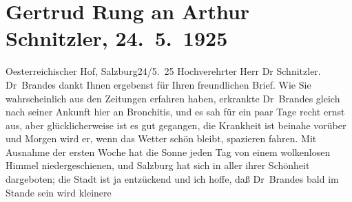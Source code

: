 

         
         \renewcommand{\erwaehntePersonen}{Personen: Georg Brandes}
         \renewcommand{\erwaehnteOrte}{Orte: Kopenhagen, Salzburg, Wien, Österreichischer Hof}
         \renewcommand{\erwaehnteWerke}{}
               \section[Gertrud Rung an Arthur Schnitzler, 24. 5. 1925]{ Gertrud Rung an Arthur Schnitzler, 24. 5. 1925}\nopagebreak{}\rehead{ }\begin{ledgroupsized}[t]{13cm}\normalsize\beginnumbering \toendnotes[C]{\smallbreak\pagebreak[2]} 
\pstart
           \raggedleft{}{\pb}Oesterreichischer Hof, Salzburg24/5. 25\pend
           \pstart{}Hochverehrter Herr Dr Schnitzler.\pend\pstart
           Dr Brandes dankt Ihnen ergebenst für Ihren
               freundlichen Brief. Wie Sie wahrscheinlich aus den Zeitungen erfahren haben,
               erkrankte Dr Brandes gleich nach seiner
               Ankunft hier an Bronchitis, und es sah für ein paar Tage recht ernst aus, aber
               glücklicherweise ist es gut gegangen, die Krankheit ist beinahe vorüber und Morgen
                  {\pb}wird er, wenn das Wetter schön
               bleibt, spazieren fahren.\pend
           \pstart
           Mit Ausnahme der ersten Woche hat die Sonne jeden Tag von einem wolkenlosen Himmel
               niedergeschienen, und Salzburg hat sich in aller
               ihrer Schönheit dargeboten; die Stadt ist ja entzückend und ich hoffe, daß Dr Brandes bald im Stande sein wird kleinere

\end{ledgroupsized}
